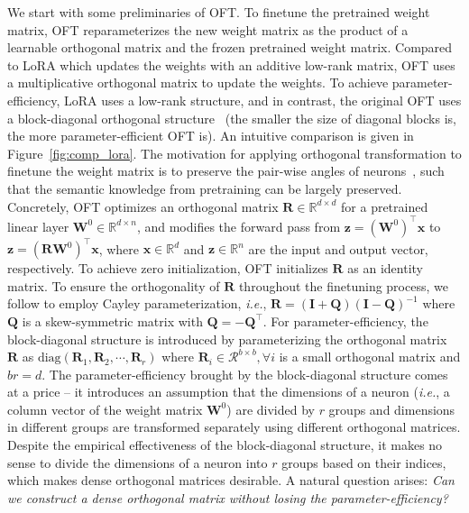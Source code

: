 We start with some preliminaries of OFT. To finetune the pretrained weight matrix, OFT reparameterizes the new weight matrix as the product of a learnable orthogonal matrix and the frozen pretrained weight matrix. Compared to LoRA which updates the weights with an additive low-rank matrix, OFT uses a multiplicative orthogonal matrix to update the weights. To achieve parameter-efficiency, LoRA uses a low-rank structure, and in contrast, the original OFT uses a block-diagonal orthogonal structure~\cite{qiu2023controlling} (the smaller the size of diagonal blocks is, the more parameter-efficient OFT is). An intuitive comparison is given in Figure~\ref{fig:comp_lora}. The motivation for applying orthogonal transformation to finetune the weight matrix is to preserve the pair-wise angles of neurons~\cite{liu2018learning,liu2021orthogonal,qiu2023controlling}, such that the semantic knowledge from pretraining can be largely preserved. Concretely, OFT optimizes an orthogonal matrix $\bm{R}\in\mathbb{R}^{d\times d}$ for a pretrained linear layer $\bm{W}^0\in\mathbb{R}^{d\times n}$, and modifies the forward pass from $\bm{z}=(\bm{W}^0)^\top\bm{x}$ to $\bm{z}=(\bm{R}\bm{W}^0)^\top\bm{x}$, where $\bm{x}\in\mathbb{R}^{d}$ and $\bm{z}\in\mathbb{R}^{n}$ are the input and output vector, respectively. To achieve zero initialization, OFT initializes $\bm{R}$ as an identity matrix. To ensure the orthogonality of $\bm{R}$ throughout the finetuning process, we follow \cite{qiu2023controlling,liu2021orthogonal} to employ Cayley parameterization, \emph{i.e.}, $\bm{R}=(\bm{I}+\bm{Q})(\bm{I}-\bm{Q})^{-1}$ where $\bm{Q}$ is a skew-symmetric matrix with $\bm{Q}=-\bm{Q}^\top$. For parameter-efficiency, the block-diagonal structure is introduced by parameterizing the orthogonal matrix $\bm{R}$ as $\text{diag}(\bm{R}_1,\bm{R}_2,\cdots,\bm{R}_r)$ where $\bm{R}_i\in\mathcal{R}^{b\times b},\forall i$ is a small orthogonal matrix and $br=d$. The parameter-efficiency brought by the block-diagonal structure comes at a price -- it introduces an assumption that the dimensions of a neuron (\emph{i.e.}, a column vector of the weight matrix $\bm{W}^0$) are divided by $r$ groups and dimensions in different groups are transformed separately using different orthogonal matrices. Despite the empirical effectiveness of the block-diagonal structure, it makes no sense to divide the dimensions of a neuron into $r$ groups based on their indices, which makes dense orthogonal matrices desirable. A natural question arises: \emph{Can we construct a dense orthogonal matrix without losing the parameter-efficiency?}


